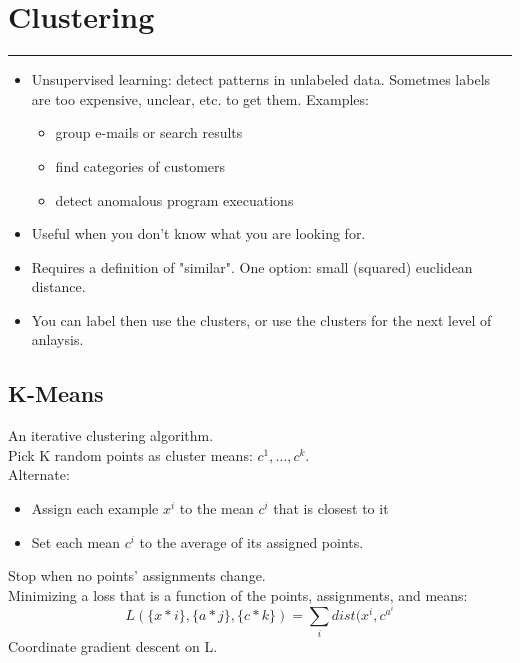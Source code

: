 \section{Clustering}
\smallskip \hrule height 2pt \smallskip

\begin{itemize}
	\item Unsupervised learning: detect patterns in unlabeled data. 
		Sometmes labels are too expensive, unclear, etc. to get them.
		Examples:
		\begin{itemize}
			\item group e-mails or search results
			\item find categories of customers
			\item detect anomalous program execuations
		\end{itemize}
	\item Useful when you don't know what you are looking for. 
	\item Requires a definition of "similar".  One option: small (squared) euclidean distance. 
	\item You can label then use the clusters, or use the clusters for the next level of anlaysis.
\end{itemize}

\subsection{K-Means}
An iterative clustering algorithm.  \hfill \\
Pick K random points as cluster means: $c^1, \dots, c^k$.  \hfill \\
Alternate:
\begin{itemize}
	\item Assign each example $x^i$ to the mean $c^i$ that is closest to it
	\item Set each mean $c^i$ to the average of its assigned points. 
\end{itemize}
Stop when no points' assignments change. \hfill \\

Minimizing a loss that is a function of the points, assignments, and means:
$$ L( \{ x*i \},  \{ a*j \},   \{ c*k \}) = \sum_i dist(x^i, c^{a^i}$$
Coordinate gradient descent on L.  \hfill \\

